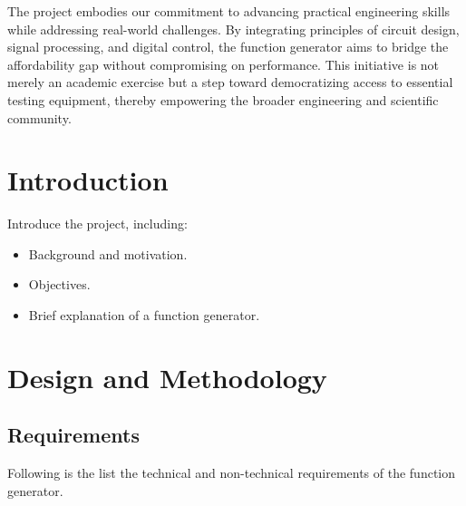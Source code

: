 \documentclass[a4paper,12pt]{article}
\begin{document}
The project embodies our commitment to advancing practical engineering skills while addressing real-world challenges. By integrating principles of circuit design, signal processing, and digital control, the function generator aims to bridge the affordability gap without compromising on performance. This initiative is not merely an academic exercise but a step toward democratizing access to essential testing equipment, thereby empowering the broader engineering and scientific community.

\section{Introduction}
Introduce the project, including:
\begin{itemize}
    \item Background and motivation.
    \item Objectives.
    \item Brief explanation of a function generator.
\end{itemize}

\section{Design and Methodology}
\subsection{Requirements}
Following is the list the technical and non-technical requirements of the function generator.
\end{document}
